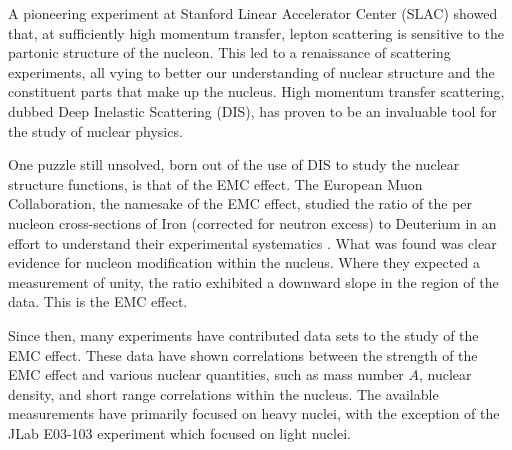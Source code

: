 %
%


A pioneering experiment at Stanford Linear Accelerator Center (SLAC) \cite{SLAC_DIS} showed that, at sufficiently high momentum transfer, lepton scattering is sensitive to the partonic structure of the nucleon. This led to a renaissance of scattering experiments, all vying to better our understanding of nuclear structure and the constituent parts that make up the nucleus. High momentum transfer scattering, dubbed Deep Inelastic Scattering (DIS), has proven to be an invaluable tool for the study of nuclear physics.

One puzzle still unsolved, born out of the use of DIS to study the nuclear structure functions, is that of the EMC effect. The European Muon Collaboration, the namesake of the EMC effect, studied the ratio of the per nucleon cross-sections of Iron (corrected for neutron excess) to Deuterium in an effort to understand their experimental systematics \cite{emc_FE}. What was found was clear evidence for nucleon modification within the nucleus. Where they expected a measurement of unity, the ratio exhibited a downward slope in the region of the data. This is the EMC effect.

Since then, many experiments have contributed data sets to the study of the EMC effect. These data have shown correlations between the strength of the EMC effect and various nuclear quantities, such as mass number $A$, nuclear density, and short range correlations within the nucleus. The available measurements have primarily focused on heavy nuclei, with the exception of the JLab E03-103 experiment which focused on light nuclei.

